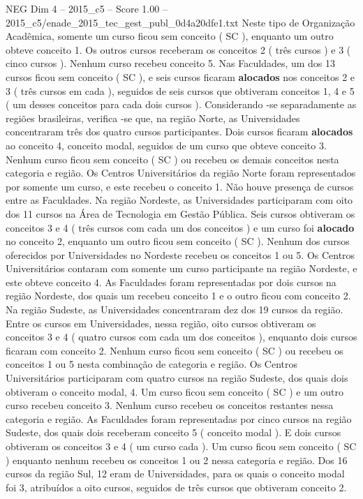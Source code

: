 \begin{textsample}{NEG Dim 4 – 2015\_c5 – Score 1.00 – 2015\_c5/enade\_2015\_tec\_gest\_publ\_0d4a20dfe1.txt}
Neste tipo de Organização Acadêmica, somente um curso ficou sem conceito ( SC ), enquanto um outro obteve conceito 1.
Os outros cursos receberam os conceitos 2 ( três cursos ) e 3 ( cinco cursos ).
Nenhum curso recebeu conceito 5.
Nas Faculdades, um dos 13 cursos ficou sem conceito ( SC ), e seis cursos ficaram \textbf{alocados} nos conceitos 2 e 3 ( três cursos em cada ), seguidos de seis cursos que obtiveram conceitos 1, 4 e 5 ( um desses conceitos para cada dois cursos ).
Considerando -se separadamente as regiões brasileiras, verifica -se que, na região Norte, as Universidades concentraram três dos quatro cursos participantes.
Dois cursos ficaram \textbf{alocados} ao conceito 4, conceito modal, seguidos de um curso que obteve conceito 3.
Nenhum curso ficou sem conceito ( SC ) ou recebeu os demais conceitos nesta categoria e região.
Os Centros Universitários da região Norte foram representados por somente um curso, e este recebeu o conceito 1.
Não houve presença de cursos entre as Faculdades.
Na região Nordeste, as Universidades participaram com oito dos 11 cursos na Área de Tecnologia em Gestão Pública.
Seis cursos obtiveram os conceitos 3 e 4 ( três cursos com cada um dos conceitos ) e um curso foi \textbf{alocado} no conceito 2, enquanto um outro ficou sem conceito ( SC ).
Nenhum dos cursos oferecidos por Universidades no Nordeste recebeu os conceitos 1 ou 5.
Os Centros Universitários contaram com somente um curso participante na região Nordeste, e este obteve conceito 4.
As Faculdades foram representadas por dois cursos na região Nordeste, dos quais um recebeu conceito 1 e o outro ficou com conceito 2.
Na região Sudeste, as Universidades concentraram dez dos 19 cursos da região.
Entre os cursos em Universidades, nessa região, oito cursos obtiveram os conceitos 3 e 4 ( quatro cursos com cada um dos conceitos ), enquanto dois cursos ficaram com conceito 2.
Nenhum curso ficou sem conceito ( SC ) ou recebeu os conceitos 1 ou 5 nesta combinação de categoria e região.
Os Centros Universitários participaram com quatro cursos na região Sudeste, dos quais dois obtiveram o conceito modal, 4.
Um curso ficou sem conceito ( SC ) e um outro curso recebeu conceito 3.
Nenhum curso recebeu os conceitos restantes nessa categoria e região.
As Faculdades foram representadas por cinco cursos na região Sudeste, dos quais dois receberam conceito 5 ( conceito modal ).
E dois cursos obtiveram os conceitos 3 e 4 ( um curso cada ).
Um curso ficou sem conceito ( SC ) enquanto nenhum recebeu os conceitos 1 ou 2 nessa categoria e região.
Dos 16 cursos da região Sul, 12 eram de Universidades, para os quais o conceito modal foi 3, atribuídos a oito cursos, seguidos de três cursos que obtiveram conceito 2.

\end{textsample}
